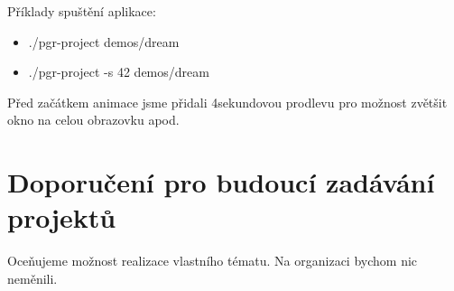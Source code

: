 \documentclass[12pt,a4paper,titlepage,final]{report}
\begin{document}
Příklady spuštění aplikace:

\begin{itemize}
	\item ./pgr-project demos/dream
  	\item ./pgr-project -s 42 demos/dream
\end{itemize}

Před začátkem animace jsme přidali 4sekundovou prodlevu pro možnost zvětšit okno na celou obrazovku apod.

\chapter{Doporučení pro budoucí zadávání projektů}

Oceňujeme možnost realizace vlastního tématu. Na organizaci bychom nic neměnili.




\nocite{patterns}
\nocite{cocos}
\nocite{wiki:dof}
\nocite{wiki:mb}
\nocite{video:kity}
\nocite{video:soe}


\end{document}
